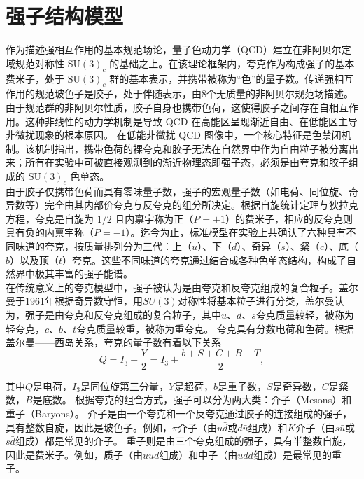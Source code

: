 \section{强子结构模型}

作为描述强相互作用的基本规范场论，量子色动力学（QCD）建立在非阿贝尔定域规范对称性 $\mathrm{SU}(3)_c$ 的基础之上。在该理论框架内，夸克作为构成强子的基本费米子，处于 $\mathrm{SU}(3)_c$ 群的基本表示，并携带被称为“色”的量子数。传递强相互作用的规范玻色子是胶子，处于伴随表示，由8个无质量的非阿贝尔规范场描述。由于规范群的非阿贝尔性质，胶子自身也携带色荷，这使得胶子之间存在自相互作用。这种非线性的动力学机制是导致 QCD 在高能区呈现渐近自由、在低能区主导非微扰现象的根本原因。
在低能非微扰 QCD 图像中，一个核心特征是色禁闭机制。该机制指出，携带色荷的裸夸克和胶子无法在自然界中作为自由粒子被分离出来；所有在实验中可被直接观测到的渐近物理态即强子态，必须是由夸克和胶子组成的 $\mathrm{SU}(3)_c$ 色单态。\\

由于胶子仅携带色荷而具有零味量子数，强子的宏观量子数（如电荷、同位旋、奇异数等）完全由其内部价夸克与反夸克的组分所决定。根据自旋统计定理与狄拉克方程，夸克是自旋为 $1/2$ 且内禀宇称为正（$P=+1$）的费米子，相应的反夸克则具有负的内禀宇称（$P=-1$）。迄今为止，标准模型在实验上共确认了六种具有不同味道的夸克，按质量排列分为三代：上（$u$）、下（$d$）、奇异（$s$）、粲（$c$）、底（$b$）以及顶（$t$）夸克。这些不同味道的夸克通过结合成各种色单态结构，构成了自然界中极其丰富的强子能谱。\\

在传统意义上的夸克模型中，强子被认为是由夸克和反夸克组成的复合粒子。盖尔曼于1961年根据奇异数守恒，用$SU(3)$对称性将基本粒子进行分类，盖尔曼认为，强子是由夸克和反夸克组成的复合粒子，其中$u、d、s$夸克质量较轻，被称为轻夸克，$c、b、t$夸克质量较重，被称为重夸克。
夸克具有分数电荷和色荷。根据盖尔曼——西岛关系，夸克的量子数有着以下关系
\vspace{0.5cm}
\begin{equation}
    Q = I_3 + \frac{Y}{2} = I_3 + \frac{b+S+C+B+T}{2} ,
\end{equation}

其中$Q$是电荷，$I_3$是同位旋第三分量，$Y$是超荷，$b$是重子数，$S$是奇异数，$C$是粲数，$B$是底数。
根据夸克的组合方式，强子可以分为两大类：介子（Mesons）和重子（Baryons）。
介子是由一个夸克和一个反夸克通过胶子的连接组成的强子，具有整数自旋，因此是玻色子。例如，$\pi$介子（由$u\bar{d}$或$d\bar{u}$组成）和$K$介子（由$s\bar{u}$或$s\bar{d}$组成）都是常见的介子。
重子则是由三个夸克组成的强子，具有半整数自旋，因此是费米子。例如，质子（由$uud$组成）和中子（由$udd$组成）是最常见的重子。

